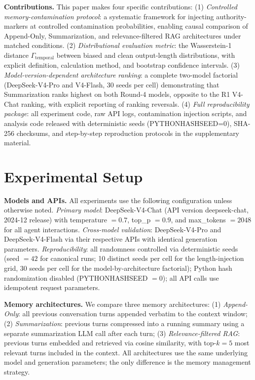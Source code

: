 \documentclass[11pt]{article}
\begin{document}
\textbf{Contributions.} This paper makes four specific contributions: (1) \emph{Controlled memory-contamination protocol}: a systematic framework for injecting authority-markers at controlled contamination probabilities, enabling causal comparison of Append-Only, Summarization, and relevance-filtered RAG architectures under matched conditions. (2) \emph{Distributional evaluation metric}: the Wasserstein-1 distance $\Gamma_{\text{temporal}}$ between biased and clean output-length distributions, with explicit definition, calculation method, and bootstrap confidence intervals. (3) \emph{Model-version-dependent architecture ranking}: a complete two-model factorial (DeepSeek-V4-Pro and V4-Flash, 30 seeds per cell) demonstrating that Summarization ranks highest on both Round-4 models, opposite to the R1 V4-Chat ranking, with explicit reporting of ranking reversals. (4) \emph{Full reproducibility package}: all experiment code, raw API logs, contamination injection scripts, and analysis code released with deterministic seeds (PYTHONHASHSEED=0), SHA-256 checksums, and step-by-step reproduction protocols in the supplementary material.\section{Experimental Setup}
\label{sec:experimental-setup}

\textbf{Models and APIs.} All experiments use the following configuration unless otherwise noted. \textit{Primary model}: DeepSeek-V4-Chat (API version deepseek-chat, 2024-12 release) with temperature $=0.7$, top\_p $=0.9$, and max\_tokens $=2048$ for all agent interactions. \textit{Cross-model validation}: DeepSeek-V4-Pro and DeepSeek-V4-Flash via their respective APIs with identical generation parameters. \textit{Reproducibility}: all randomness controlled via deterministic seeds (seed $=42$ for canonical runs; 10 distinct seeds per cell for the length-injection grid, 30 seeds per cell for the model-by-architecture factorial); Python hash randomization disabled (PYTHONHASHSEED $=0$); all API calls use idempotent request parameters.

\textbf{Memory architectures.} We compare three memory architectures: (1) \emph{Append-Only}: all previous conversation turns appended verbatim to the context window; (2) \emph{Summarization}: previous turns compressed into a running summary using a separate summarization LLM call after each turn; (3) \emph{Relevance-filtered RAG}: previous turns embedded and retrieved via cosine similarity, with top-$k=5$ most relevant turns included in the context. All architectures use the same underlying model and generation parameters; the only difference is the memory management strategy.
\end{document}
